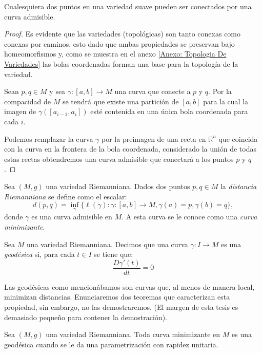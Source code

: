 \begin{lemma}
	Cualesquiera dos puntos en una variedad suave pueden ser conectados por una curva admisible.
\end{lemma}

\begin{proof}
	Es evidente que las variedades (topológicas) son tanto conexas como conexas por caminos, esto dado que ambas propiedades se preservan bajo homeomorfismos y, como se muestra en el anexo \ref{Anexo: Topologia De Variedades} las bolas coordenadas forman una base para la topología de la variedad.

	Sean $p, q \in M$ y sea $\gamma: [a,b] \to M$ una curva que conecte a $p$ y $q$. Por la compacidad de $M$ se tendrá que existe una partición de $[a,b]$ para la cual la imagen de $\gamma([a_{i-1}, a_i])$ esté contenida en una única bola coordenada para cada $i$.

	Podemos remplazar la curva $\gamma$ por la preimagen de una recta en $\mathbb{R}^{n}$ que coincida con la curva en la frontera de la bola coordenada, considerado la unión de todas estas rectas obtendremos una curva admisible que conectará a los puntos $p$ y $q$.
\end{proof}

\begin{definition}
	Sea $(M,g)$ una variedad Riemanniana. Dados dos puntos $p,q \in M$ la \textit{distancia Riemanniana} se define como el escalar:
	\[
		d(p,q) = \inf_{\gamma} \{\ell(\gamma): \gamma: [a,b] \to M, \gamma(a) = p, \gamma(b) = q\},
	\]
	donde $\gamma$ es una curva admisible en $M$. A esta curva se le conoce como una \textit{curva minimizante}.
\end{definition}

\begin{definition}[Geodésica]
	Sea $M$ una variedad Riemanniana. Decimos que una curva $\gamma: I \to M$ es una \textit{geodésica} si, para cada $t \in I$ se tiene que:
	\[
		\frac{D\gamma'(t)}{dt} = 0
	\]
\end{definition}
Las geodésicas como mencionábamos son curvas que, al menos de manera local, minimizan distancias. Enunciaremos dos teoremas que caracterizan esta propiedad, sin embargo, no las demostraremos. (El margen de esta tesis es demasiado pequeño para contener la demostración).

\begin{theorem}
	Sea $(M,g)$ una variedad Riemanniana. Toda curva minimizante en $M$ es una geodésica cuando se le da una parametrización con rapidez unitaria.
\end{theorem}


